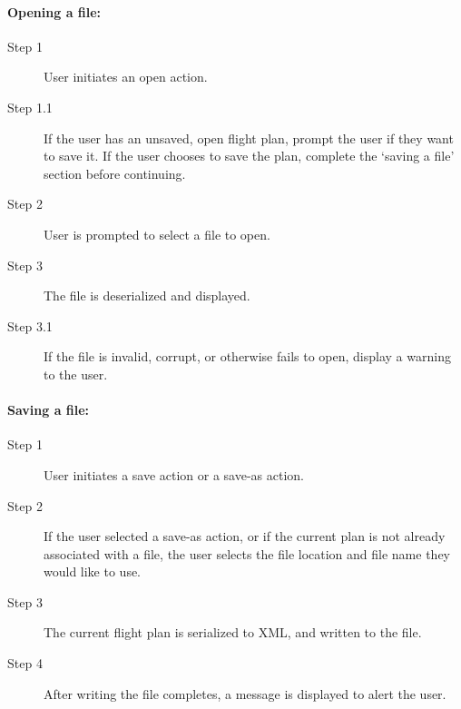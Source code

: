 \documentclass[12pt, letterpaper]{article}
\begin{document}
            \paragraph{Opening a file:}
            \begin{description}
              \item[Step 1] User initiates an open action.
              \item[Step 1.1] If the user has an unsaved, open flight plan, prompt the user if they want to save it.
                If the user chooses to save the plan, complete the `saving a file' section before continuing.
              \item[Step 2] User is prompted to select a file to open.
              \item[Step 3] The file is deserialized and displayed.
              \item[Step 3.1] If the file is invalid, corrupt, or otherwise fails to open, display a warning to the user.
            \end{description}
            \paragraph{Saving a file:}
            \begin{description}
              \item[Step 1] User initiates a save action or a save-as action.
              \item[Step 2] If the user selected a save-as action, or if the current plan is not already associated with a file,
                the user selects the file location and file name they would like to use.
              \item[Step 3] The current flight plan is serialized to XML, and written to the file.
              \item[Step 4] After writing the file completes, a message is displayed to alert the user.
            \end{description}
\end{document}
